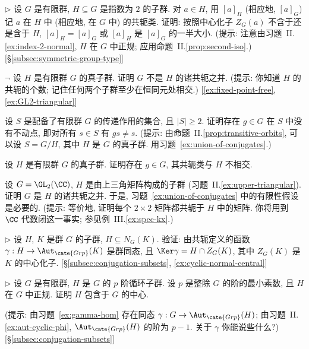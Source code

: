 \begin{prob}
\label{ex:index-2-classes}
$\triangleright$ 设 $G$ 是有限群, $H \subseteq G$ 是指数为 $2$ 的子群. 对 $a \in H$, 用 $[a]_H$ (相应地, $[a]_G$) 记 $a$ 在 $H$ 中 (相应地, 在 $G$ 中) 的共轭类. 证明: 按照中心化子 $Z_G(a)$ 不含于还是含于 $H$, $[a]_H = [a]_G$ 或 $[a]_H$ 是 $[a]_G$ 的一半大小. (提示: 注意由习题~II.\ref{ex:index-2-normal}, $H$ 在 $G$ 中正规; 应用命题~II.\ref{prop:second-iso}.) [\S\ref{subsec:symmetric-group-type}]
\end{prob}

\begin{prob}
\label{ex:union-of-conjugates}
$\neg$ 设 $H$ 是有限群 $G$ 的真子群. 证明 $G$ 不是 $H$ 的诸共轭之并. (提示: 你知道 $H$ 的共轭的个数; 记住任何两个子群至少在恒同元处相交.) [\ref{ex:fixed-point-free}, \ref{ex:GL2-triangular}]
\end{prob}

\begin{prob}
\label{ex:fixed-point-free}
设 $S$ 是配备了有限群 $G$ 的传递作用的集合, 且 $|S| \geq 2$. 证明存在 $g \in G$ 在 $S$ 中没有不动点, 即对所有 $s \in S$ 有 $gs \neq s$. (提示: 由命题~II.\ref{prop:transitive-orbits}, 可以设 $S = G/H$, 其中 $H$ 是 $G$ 的真子群. 用习题~\ref{ex:union-of-conjugates}.)
\end{prob}

\begin{prob}
\label{ex:conjugacy-disjoint}
设 $H$ 是有限群 $G$ 的真子群. 证明存在 $g \in G$, 其共轭类与 $H$ 不相交.
\end{prob}

\begin{prob}
\label{ex:GL2-triangular}
设 $G = \GL_2(\CC)$, $H$ 是由上三角矩阵构成的子群 (习题~II.\ref{ex:upper-triangular}). 证明 $G$ 是 $H$ 的诸共轭之并. 于是, 习题~\ref{ex:union-of-conjugates} 中的有限性假设是必要的. (提示: 等价地, 证明每个 $2 \times 2$ 矩阵都共轭于 $H$ 中的矩阵. 你将用到 $\CC$ 代数闭这一事实; 参见例~III.\ref{ex:spec-kx}.)
\end{prob}

\begin{prob}
\label{ex:gamma-hom}
$\triangleright$ 设 $H$, $K$ 是群 $G$ 的子群, $H \subseteq N_G(K)$. 验证: 由共轭定义的函数 $\gamma : H \to \Aut_{\cate{Grp}}(K)$ 是群同态, 且 $\Ker \gamma = H \cap Z_G(K)$, 其中 $Z_G(K)$ 是 $K$ 的中心化子. [\S\ref{subsec:conjugation-subsets}, \ref{ex:cyclic-normal-central}]
\end{prob}

\begin{prob}
\label{ex:cyclic-normal-central}
$\triangleright$ 设 $G$ 是有限群, $H$ 是 $G$ 的 $p$ 阶循环子群. 设 $p$ 是整除 $G$ 的阶的最小素数, 且 $H$ 在 $G$ 中正规. 证明 $H$ 包含于 $G$ 的中心.

(提示: 由习题~\ref{ex:gamma-hom} 存在同态 $\gamma : G \to \Aut_{\cate{Grp}}(H)$; 由习题~II.\ref{ex:aut-cyclic-phi}, $\Aut_{\cate{Grp}}(H)$ 的阶为 $p - 1$. 关于 $\gamma$ 你能说些什么?) [\S\ref{subsec:conjugation-subsets}]
\end{prob}

